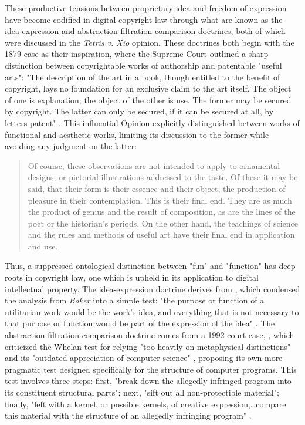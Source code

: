 These productive tensions between proprietary idea and freedom of expression have become codified in digital copyright law through what are known as the idea-expression and abstraction-filtration-comparison doctrines, both of which were discussed in the \emph{Tetris v. Xio} opinion. These doctrines both begin with the 1879 case  as their inspiration, where the Supreme Court outlined a sharp distinction between copyrightable works of authorship and patentable "useful arts": "The description of the art in a book, though entitled to the benefit of copyright, lays no foundation for an exclusive claim to the art itself. The object of one is explanation; the object of the other is use. The former may be secured by copyright. The latter can only be secured, if it can be secured at all, by letters-patent" \autocite*[105]{baker-selden}. This influential Opinion explicitly distinguished between works of functional and aesthetic works, limiting its discussion to the former while avoiding any judgment on the latter:
\blockcquote[103--4]{baker-selden}{
  Of course, these observations are not intended to apply to ornamental designs, or pictorial illustrations addressed to the taste. Of these it may be said, that their form is their essence and their object, the production of pleasure in their contemplation. This is their final end. They are as much the product of genius and the result of composition, as are the lines of the poet or the historian's periods. On the other hand, the teachings of science and the rules and methods of useful art have their final end in application and use.
}
Thus, a suppressed ontological distinction between "fun" and "function" has deep roots in copyright law, one which is upheld in its application to digital intellectual property. The idea-expression doctrine derives from , which condensed the analysis from \emph{Baker} into a simple test: "the purpose or function of a utilitarian work would be the work's idea, and everything that is not necessary to that purpose or function would be part of the expression of the idea" \autocite*[1236]{whelan-jaslow}. The abstraction-filtration-comparison doctrine comes from a 1992 court case, , which criticized the Whelan test for relying "too heavily on metaphysical distinctions" and its "outdated appreciation of computer science" \autocite[706]{altai}, proposing its own more pragmatic test designed specifically for the structure of computer programs. This test involves three steps: first, "break down the allegedly infringed program into its constituent structural parts"; next, "sift out all non-protectible material"; finally, "left with a kernel, or possible kernels, of creative expression,…compare this material with the structure of an allegedly infringing program" \autocite[706]{altai}.

